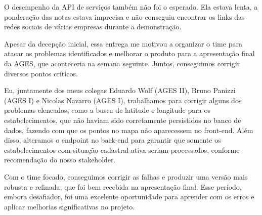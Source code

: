 \indent O desempenho da API de serviços também não foi o esperado. Ela estava lenta, a ponderação das notas estava imprecisa e não conseguiu encontrar os links das redes sociais de várias empresas durante a demonstração.\par

\indent Apesar da decepção inicial, essa entrega me motivou a organizar o time para atacar os problemas identificados e melhorar o produto para a apresentação final da AGES, que aconteceria na semana seguinte. Juntos, conseguimos corrigir diversos pontos críticos.\par

\indent Eu, juntamente dos meus colegas Eduardo Wolf (AGES II), Bruno Panizzi (AGES I) e Nicolas Navarro (AGES I), trabalhamos para corrigir alguns dos problemas elencados, como a busca de latitude e longitude para os estabelecimentos, que não haviam sido corretamente persistidos no banco de dados, fazendo com que os pontos no mapa não aparecessem no front-end. Além disso, alteramos o endpoint no back-end para garantir que somente os estabelecimentos com situação cadastral ativa seriam processados, conforme recomendação do nosso stakeholder.\par

\indent Com o time focado, conseguimos corrigir as falhas e produzir uma versão mais robusta e refinada, que foi bem recebida na apresentação final. Esse período, embora desafiador, foi uma excelente oportunidade para aprender com os erros e aplicar melhorias significativas no projeto.\par

